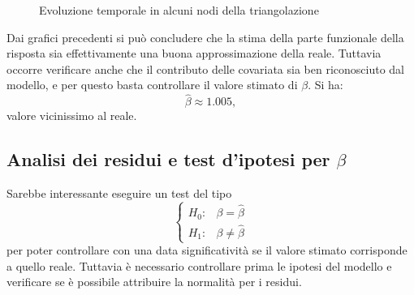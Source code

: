 \documentclass[a4paper,11pt,twoside,openright]{book}							%
\begin{document}
\begin{figure}[t]
	\centering
	\caption{Evoluzione temporale in alcuni nodi della triangolazione}
	\label{fig:DomCcovar_ris2}
\end{figure}

Dai grafici precedenti si può concludere che la stima della parte funzionale della risposta sia effettivamente una buona approssimazione della reale. Tuttavia occorre verificare anche che il contributo delle covariata sia ben riconosciuto dal modello, e per questo basta controllare il valore stimato di $\beta$. Si ha:
$$
\hat{\beta} \approx 1.005,
$$
valore vicinissimo al reale.

\subsection{Analisi dei residui e test d'ipotesi per $\beta$}
Sarebbe interessante eseguire un test del tipo
$$
\begin{cases}
H_0: & \beta=\hat{\beta} \\
H_1: & \beta \not = \hat{\beta}
\end{cases}
$$
per poter controllare con una data significatività se il valore stimato corrisponde a quello reale. Tuttavia è necessario controllare prima le ipotesi del modello e verificare se è possibile attribuire la normalità per i residui.
\end{document}
